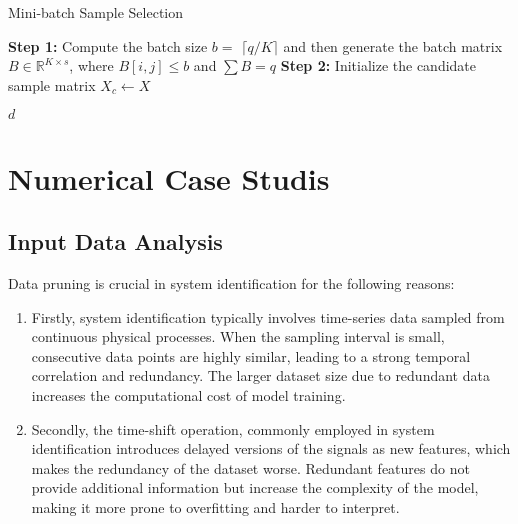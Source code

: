 \documentclass{article}
\begin{document}
\begin{algorithm}[htpb]
\caption{Mini-batch Sample Selection}\label{alg:mini_batch_DP}

\textbf{Step 1:} Compute the batch size $b =$  \( \lceil q/K \rceil \) and then generate the batch matrix $B \in \mathbb{R}^{K \times s}$, where $B[i, j] \leq b$ and $\sum B = q$\;  
\textbf{Step 2:} Initialize the candidate sample matrix $X_c \gets X$\;  

\Return $d$\;
\end{algorithm}

\section{Numerical Case Studis}
\subsection{Input Data Analysis}
Data pruning is crucial in system identification for the following reasons: 
\begin{enumerate}
    \item Firstly, system identification typically involves time-series data sampled from continuous physical processes. When the sampling interval is small, consecutive data points are highly similar, leading to a strong temporal correlation and redundancy. The larger dataset size due to redundant data increases the computational cost of model training.
    \item Secondly, the time-shift operation, commonly employed in system identification introduces delayed versions of the signals as new features, which makes the redundancy of the dataset worse. Redundant features do not provide additional information but increase the complexity of the model, making it more prone to overfitting and harder to interpret. 
\end{enumerate}
\end{document}
